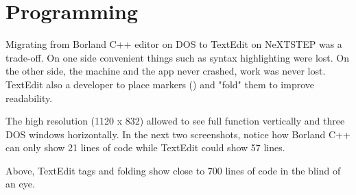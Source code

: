 
\section{Programming}
Migrating from Borland C++ editor on DOS to TextEdit on NeXTSTEP was a trade-off. On one side convenient things such as syntax highlighting were lost. On the other side, the machine and the app never crashed, work was never lost. TextEdit also a developer to place markers (\cw{//}) and "fold" them to improve readability.\\
\par
 The high resolution (1120 x 832) allowed to see full function vertically and three DOS windows horizontally. In the next two screenshots, notice how Borland C++ can only show 21 lines of code while TextEdit could show 57 lines.\\
\par
{}


\par
Above, TextEdit tags and folding show close to 700 lines of code in the blind of an eye.
